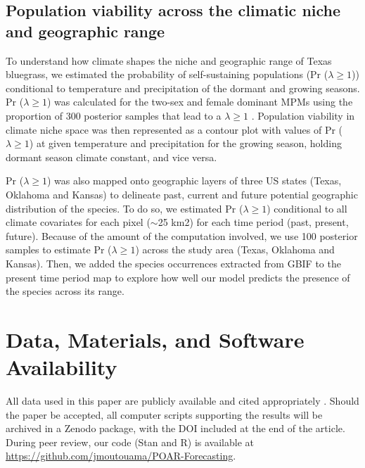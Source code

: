 \documentclass[9pt,twocolumn,twoside,lineno]{pnas-new}
\newcommand{\tom}[2]{{\color{red}{#1}}\footnote{\textit{\color{red}{#2}}}}
\begin{document}
\subsection*{Population viability across the climatic niche and geographic range}
To understand how climate shapes the niche and geographic range of Texas bluegrass, we estimated the probability of self-sustaining populations (Pr ($\lambda \ge 1$)) conditional to temperature and precipitation of the dormant and growing seasons.
Pr ($\lambda \ge 1$) was calculated for the two-sex and female dominant MPMs using the proportion of 300 posterior samples that lead to a $\lambda \ge 1$ \citep{diez2014probabilistic}.
Population viability in climate niche space was then represented as a contour plot with values of Pr ($\lambda \ge 1$) at given temperature and precipitation for the growing season, holding dormant season climate constant, and vice versa. 

Pr ($\lambda \ge 1$) was also mapped onto geographic layers of three US states (Texas, Oklahoma and Kansas) to delineate past, current and future potential geographic distribution of the species.
To do so, we estimated Pr ($\lambda \ge 1$) conditional to all climate covariates for each pixel ($\sim$25 km2) for each time period (past, present, future).
Because of the amount of the computation involved, we use 100 posterior samples to estimate Pr ($\lambda \ge 1$) across the study area (Texas, Oklahoma and Kansas).
Then, we added the species occurrences extracted from GBIF to the present time period map to explore how well our model predicts the presence of the species across its range.


\showmatmethods{} %

\section*{Data, Materials, and Software Availability}
All data used in this paper are  publicly available and cited appropriately \citep{dryaddata}. 
Should the paper be accepted, all computer scripts supporting the results will be archived in a Zenodo package, with the DOI included at the end of the article. 
During peer review, our code (Stan and R) is available at \url{https://github.com/jmoutouama/POAR-Forecasting}. 
\end{document}
